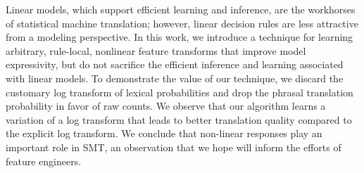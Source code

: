 Linear models, which support efficient learning and inference, are the workhorses of statistical machine translation; however, linear decision rules are less attractive from a modeling perspective. In this work, we introduce a technique for learning arbitrary, rule-local, nonlinear feature transforms that improve model expressivity, but do not sacrifice the efficient inference and learning associated with linear models. To demonstrate the value of our technique, we discard the customary log transform of lexical probabilities and drop the phrasal translation probability in favor of raw counts. We observe that our algorithm learns a variation of a log transform that leads to better translation quality compared to the explicit log transform. We conclude that non-linear responses play an important role in SMT, an observation that we hope will inform the efforts of feature engineers.